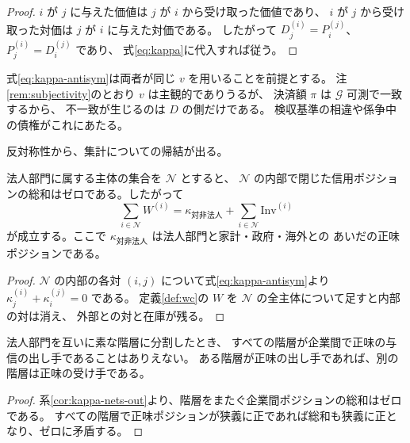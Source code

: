 \begin{proof}
$i$ が $j$ に与えた価値は $j$ が $i$ から受け取った価値であり、
$i$ が $j$ から受け取った対価は $j$ が $i$ に与えた対価である。
したがって $D_j^{(i)}=P_i^{(j)}$、$P_j^{(i)}=D_i^{(j)}$ であり、
式\eqref{eq:kappa}に代入すれば従う。
\end{proof}

\begin{remark}[$v$ の共有が要る]
式\eqref{eq:kappa-antisym}は両者が同じ $v$ を用いることを前提とする。
注\ref{rem:subjectivity}のとおり $v$ は主観的でありうるが、
決済額 $\pi$ は $\mathcal{G}$ 可測で一致するから、
不一致が生じるのは $D$ の側だけである。
検収基準の相違や係争中の債権がこれにあたる。
\end{remark}

反対称性から、集計についての帰結が出る。

\begin{corollary}[企業間の信用は集計で消える]
\label{cor:kappa-nets-out}
法人部門に属する主体の集合を $\mathcal{N}$ とすると、
$\mathcal{N}$ の内部で閉じた信用ポジションの総和はゼロである。したがって
\begin{equation}
\sum_{i\in\mathcal{N}} W^{(i)}
= \kappa_{\text{対非法人}} + \sum_{i\in\mathcal{N}}\mathrm{Inv}^{(i)}
\label{eq:aggregate-W}
\end{equation}
が成立する。ここで $\kappa_{\text{対非法人}}$ は法人部門と家計・政府・海外との
あいだの正味ポジションである。
\end{corollary}

\begin{proof}
$\mathcal{N}$ の内部の各対 $(i,j)$ について式\eqref{eq:kappa-antisym}より
$\kappa_j^{(i)}+\kappa_i^{(j)}=0$ である。
定義\ref{def:wc}の $W$ を $\mathcal{N}$ の全主体について足すと内部の対は消え、
外部との対と在庫が残る。
\end{proof}

\begin{corollary}[すべての階層が与信の出し手にはなれない]
\label{cor:no-uniform-direction}
法人部門を互いに素な階層に分割したとき、
すべての階層が企業間で正味の与信の出し手であることはありえない。
ある階層が正味の出し手であれば、別の階層は正味の受け手である。
\end{corollary}

\begin{proof}
系\ref{cor:kappa-nets-out}より、階層をまたぐ企業間ポジションの総和はゼロである。
すべての階層で正味ポジションが狭義に正であれば総和も狭義に正となり、ゼロに矛盾する。
\end{proof}

